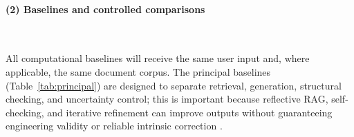 \documentclass[11pt,letterpaper]{article}
\begin{document}
\paragraph{(2) Baselines and controlled comparisons}~{}

All computational baselines will receive the same user input and, where applicable, the same document corpus. The principal baselines (Table~\ref{tab:principal}) are designed to separate retrieval, generation, structural checking, and uncertainty control; this is important because reflective RAG, self-checking, and iterative refinement can improve outputs without guaranteeing engineering validity or reliable intrinsic correction \cite{asai2024selfrag,manakul2023selfcheckgpt,madaan2023selfrefine,shinn2023reflexion,huang2024selfcorrect}. 

\vspace{-3pt}
\end{document}

